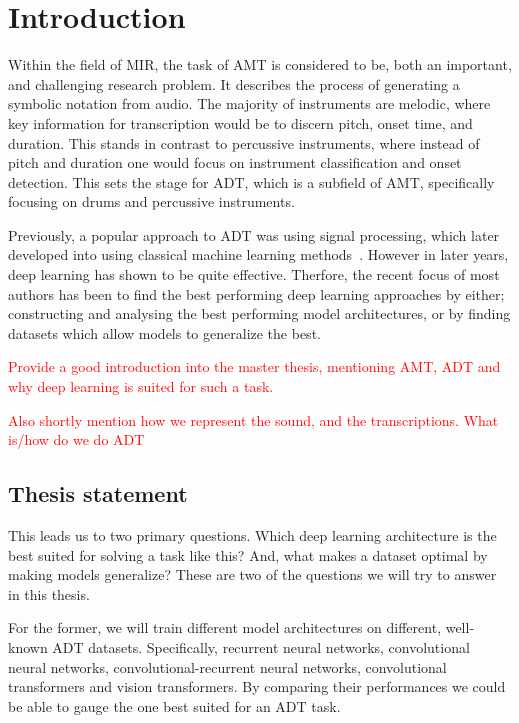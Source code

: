 \chapter{Introduction}

Within the field of \gls{MIR}, the task of \gls{AMT} is considered to be, both an important, and challenging research problem. It describes the process of generating a symbolic notation from audio. The majority of instruments are melodic, where key information for transcription would be to discern pitch, onset time, and duration. This stands in contrast to percussive instruments, where instead of pitch and duration one would focus on instrument classification and onset detection. This sets the stage for \gls{ADT}, which is a subfield of \gls{AMT}, specifically focusing on drums and percussive instruments.~\cite{8350302}

Previously, a popular approach to \gls{ADT} was using signal processing, which later developed into using classical machine learning methods~\cite{8350302}. However in later years, deep learning has shown to be quite effective. Therfore, the recent focus of most authors has been to find the best performing deep learning approaches by either; constructing and analysing the best performing model architectures, or by finding datasets which allow models to generalize the best.~\cite{signals4040042}

\textcolor{red}{Provide a good introduction into the master thesis, mentioning \gls{AMT}, \gls{ADT} and why deep learning is suited for such a task.}

\textcolor{red}{Also shortly mention how we represent the sound, and the transcriptions. What is/how do we do \gls{ADT}}

\section{Thesis statement}

This leads us to two primary questions. Which deep learning architecture is the best suited for solving a task like this? And, what makes a dataset optimal by making models generalize? These are two of the questions we will try to answer in this thesis. 

For the former, we will train different model architectures on different, well-known \gls{ADT} datasets. Specifically, recurrent neural networks, convolutional neural networks, convolutional-recurrent neural networks, convolutional transformers and vision transformers. By comparing their performances we could be able to gauge the one best suited for an \gls{ADT} task.


